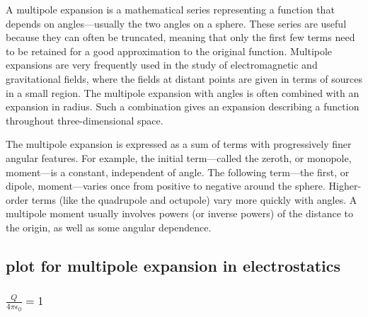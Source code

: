 \documentclass[12pt,a4paper]{article}
\begin{document}
A multipole expansion is a mathematical series representing a function that depends on angles—usually the two angles on a sphere. These series are useful because they can often be truncated, meaning that only the first few terms need to be retained for a good approximation to the original function. Multipole expansions are very frequently used in the study of electromagnetic and gravitational fields, where the fields at distant points are given in terms of sources in a small region. The multipole expansion with angles is often combined with an expansion in radius. Such a combination gives an expansion describing a function throughout three-dimensional space.


The multipole expansion is expressed as a sum of terms with progressively finer angular features. For example, the initial term—called the zeroth, or monopole, moment—is a constant, independent of angle. The following term—the first, or dipole, moment—varies once from positive to negative around the sphere. Higher-order terms (like the quadrupole and octupole) vary more quickly with angles. A multipole moment usually involves powers (or inverse powers) of the distance to the origin, as well as some angular dependence.
\subsection{plot for multipole expansion in electrostatics}
\subsubsection{$\frac{Q}{4\pi\epsilon_0} = 1$}
 \\
\end{document}
